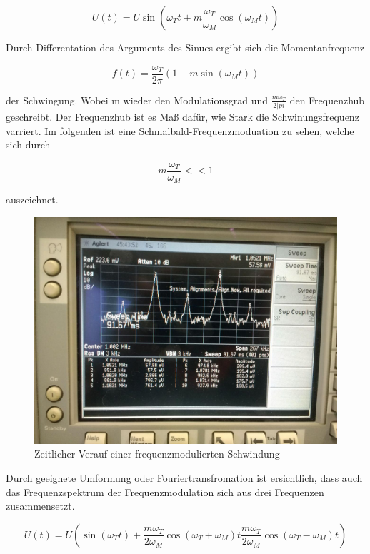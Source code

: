 \begin{equation}
U(t)= U\sin(\omega_T t + m \frac{\omega_T}{\omega_M} \cos(\omega_M t))
\end{equation}

Durch Differentation des Arguments des Sinues ergibt sich die Momentanfrequenz

\begin{equation}
f(t) = \frac{\omega_T}{2\pi}(1-m\sin(\omega_M t))
\end{equation}

der Schwingung. Wobei m wieder den Modulationsgrad und $\frac{m\omega_T}{2|pi}$ den Frequenzhub geschreibt. Der Frequenzhub ist es Maß dafür, wie Stark die Schwinungsfrequenz varriert. Im folgenden ist eine Schmalbald-Frequenzmoduation zu sehen, welche sich durch

\begin{equation}
m\frac{\omega_T}{\omega_M} << 1
\end{equation}

auszeichnet.

\begin{figure}
	\centering
	\includegraphics[width=\textwidth]{img/Aufgabenteil_b.jpg}
	\caption{Zeitlicher Verauf einer frequenzmodulierten Schwindung}
\end{figure}

Durch geeignete Umformung oder Fouriertransfromation ist ersichtlich, dass auch das Frequenzspektrum der Frequenzmodulation sich aus drei
Frequenzen zusammensetzt.

\begin{equation}
U(t) = U(\sin(\omega_T t) + \frac{m\omega_T}{2\omega_M}\cos(\omega_T + \omega_M) t \frac{m\omega_T}{2\omega_M}\cos(\omega_T - \omega_M) t)
\end{equation}

